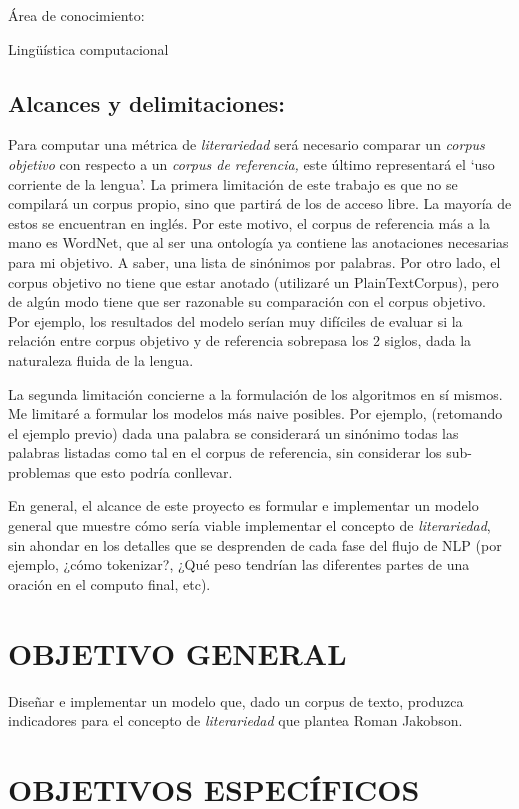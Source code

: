 \documentclass[twoside]{article}
\begin{document}
Área de conocimiento:

Lingüística computacional

\subsection{Alcances y delimitaciones:}
\label{sec:org607f591}

Para computar una métrica de \emph{literariedad} será necesario comparar
un \emph{corpus objetivo} con respecto a un \emph{corpus de referencia,} este
último representará el ‘uso corriente de la lengua'. La primera
limitación de este trabajo es que no se compilará un corpus propio, sino
que partirá de los de acceso libre. La mayoría de estos se encuentran en
inglés. Por este motivo, el corpus de referencia más a la mano es
WordNet, que al ser una ontología ya contiene las anotaciones necesarias
para mi objetivo. A saber, una lista de sinónimos por palabras. Por otro
lado, el corpus objetivo no tiene que estar anotado (utilizaré un
PlainTextCorpus), pero de algún modo tiene que ser razonable su
comparación con el corpus objetivo. Por ejemplo, los resultados del
modelo serían muy difíciles de evaluar si la relación entre corpus
objetivo y de referencia sobrepasa los 2 siglos, dada la naturaleza
fluida de la lengua.

La segunda limitación concierne a la formulación de los algoritmos en sí
mismos. Me limitaré a formular los modelos más naive posibles. Por
ejemplo, (retomando el ejemplo previo) dada una palabra se considerará
un sinónimo todas las palabras listadas como tal en el corpus de
referencia, sin considerar los sub-problemas que esto podría conllevar.

En general, el alcance de este proyecto es formular e implementar un
modelo general que muestre cómo sería viable implementar el concepto de
\emph{literariedad}, sin ahondar en los detalles que se desprenden de cada
fase del flujo de NLP (por ejemplo, ¿cómo tokenizar?, ¿Qué peso tendrían
las diferentes partes de una oración en el computo final, etc).

\section{OBJETIVO GENERAL}
\label{sec:org1e9c519}
Diseñar e implementar un modelo que, dado un corpus de texto, produzca
indicadores para el concepto de \emph{literariedad} que plantea Roman Jakobson.

\section{OBJETIVOS ESPECÍFICOS}
\label{sec:orgd303bfb}
\end{document}
